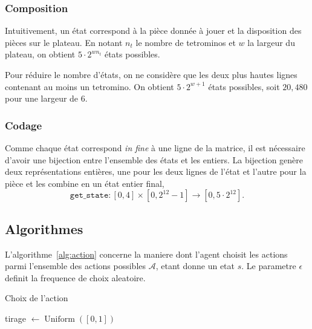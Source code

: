 \documentclass{article}
\DeclareMathOperator{\argmax}{argmax}
\DeclareMathOperator{\uniform}{Uniform}
\begin{document}
\subsubsection{Composition}
Intuitivement, un état correspond à la pièce donnée à jouer et la disposition
des pièces sur le plateau. En notant \(n_t\) le nombre de tetrominos et \(w\) la
largeur du plateau, on obtient \(5 \cdot 2^{wn_t}\) états possibles.

Pour réduire le nombre d'états, on ne considère que les deux plus hautes lignes
contenant au moins un tetromino. On obtient \(5\cdot 2^{w+1}\) états possibles,
soit \(20,480\) pour une largeur de 6.

\subsubsection{Codage}
Comme chaque état correspond \textit{in fine} à une ligne de la matrice, il est
nécessaire d'avoir une bijection entre l'ensemble des états et les entiers. La
bijection genère deux représentations entières, une pour les deux lignes de
l'état et l'autre pour la pièce et les combine en un état entier final,
\[
  \texttt{get\_state}\colon [0,4]\times [0, 2^{12} - 1] \to [0, 5\cdot 2^{12}].
\]


\subsection{Algorithmes}

L'algorithme~\ref{alg:action} concerne la maniere dont l'agent choisit les
actions parmi l'ensemble des actions possibles \(\mathcal{A}\), etant donne un
etat \(s\). Le parametre \(\epsilon\) definit la frequence de choix aleatoire.
\begin{algorithm}
  \caption{Choix de l'action}\label{alg:action}
  \begin{algorithmic}
    [1]
    \State{} tirage \(\gets \uniform([0, 1])\)
    \Return{\(\argmax_{a\in\mathcal{A}} Q(s, a)\)}
    \Else{}
    \Return{\(\uniform(\mathcal{A})\)}
    \EndIf{}
    \EndProcedure{}
  \end{algorithmic}
\end{algorithm}
\end{document}
